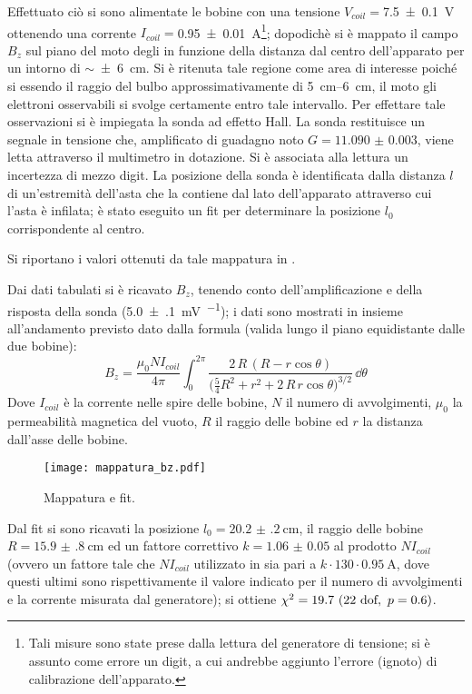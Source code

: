 		Effettuato ciò si sono alimentate le bobine con una tensione
		$V_{coil}=$\SI{7.5 \pm 0.1}{\volt} ottenendo una corrente
		$I_{coil}=$\SI{0.95 \pm 0.01}{\ampere}\footnote{Tali misure sono state prese
		dalla lettura del generatore di tensione;
		si è assunto come errore un digit, a cui andrebbe
		aggiunto l'errore (ignoto) di calibrazione dell'apparato.};
		dopodichè si è mappato il campo $B_z$ sul
		piano del moto degli \e in funzione della distanza dal centro dell'apparato
		per un intorno di $\sim $\SI{\pm 6}{\cm}.
		Si è ritenuta tale regione come area di interesse poiché si essendo il
		raggio del bulbo approssimativamente di \SIrange{5}{6}{\cm},
		il moto gli elettroni osservabili si svolge certamente entro tale intervallo.
		Per effettare tale osservazioni si è impiegata la sonda ad effetto Hall.
		La sonda restituisce un segnale in tensione che, amplificato
		di guadagno noto $G = \num{11.090(3)}$, viene letta attraverso il multimetro
		in dotazione. Si è associata alla lettura un incertezza di mezzo digit.
		La posizione della sonda è identificata dalla distanza $l$ di un'estremità dell'asta
		che la contiene dal lato dell'apparato attraverso cui l'asta è infilata;
		è stato eseguito un fit per determinare la posizione $l_0$ corrispondente al centro.

		Si riportano i valori ottenuti da tale mappatura in .

	Dai dati tabulati si è ricavato $B_z$, tenendo conto dell'amplificazione e della risposta della sonda
	(\SI{5.0(1)}{\mV\per\gauss}); i dati sono mostrati in  insieme all'andamento previsto
	dato dalla formula (valida lungo il piano equidistante dalle due bobine):
	\begin{equation} \label{eq:bz}
		B_z = \frac{\mu_0 N I_{coil}}{4 \pi} \int_0^{2\pi} \frac{2\, R\, (R - r \cos\theta )}{\big(\frac{5}{4} R^2 + r^2 + 2\, R \, r \cos \theta\big) ^ {3/2}} \, \dd \theta
	\end{equation}
	Dove $I_{coil}$ è la corrente nelle spire delle bobine, $N$ il numero di avvolgimenti,
	$\mu_0$ la permeabilità magnetica del vuoto, $R$ il raggio delle bobine
	ed $r$ la distanza dall'asse delle bobine.

	\begin{figure}[h]
		\centering
		\texttt{[image: mappatura\_bz.pdf]}
		\caption{Mappatura e fit.}
		\label{fig:fit1}
	\end{figure}

	Dal fit si sono ricavati la posizione $l_0 = \SI{20.2(2)}{\cm} $, il raggio
	delle bobine $R = \SI{15.9(8)}{\cm}$ ed un fattore correttivo $k = \num{1.06(5)}$
	al prodotto $N I_{coil}$ (ovvero un fattore tale che $N I_{coil}$ utilizzato in 
	sia pari a $k \cdot  130 \cdot  \SI{0.95}{\A}$, dove questi ultimi sono rispettivamente il valore
	indicato per il numero di avvolgimenti e la corrente misurata dal generatore);
	si ottiene $\chi^2 = 19.7 \ (22 \text{ dof} , \  p = 0.6)$.

